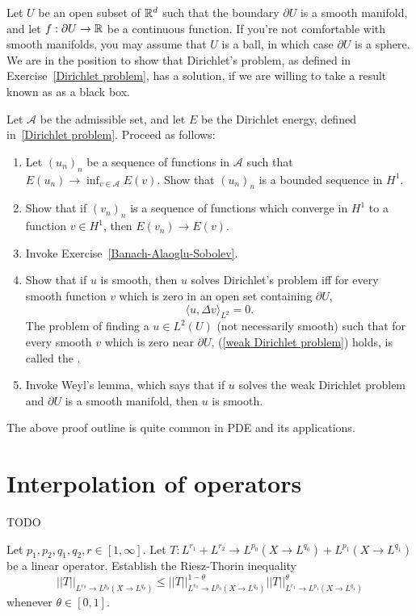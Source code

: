 \begin{exercise}\label{Dirichlet problem 2}
Let $U$ be an open subset of $\mathbb{R}^{d}$ such that the boundary $\partial U$ is a smooth manifold, and let $f: \partial U \to \mathbb{R}$ be a continuous function.
If you're not comfortable with smooth manifolds, you may assume that $U$ is a ball, in which case $\partial U$ is a sphere.
We are in the position to show that Dirichlet's problem, as defined in Exercise~\ref{Dirichlet problem}, has a solution, if we are willing to take a result known as  as a black box.

Let $\mathcal A$ be the admissible set, and let $E$ be the Dirichlet energy, defined in~\ref{Dirichlet problem}.
Proceed as follows:
\begin{enumerate}
\item Let ${(u_{n})}_{n}$ be a sequence of functions in $\mathcal A$ such that $E(u_{n}) \to \inf_{v \in \mathcal A} E(v)$.
Show that ${(u_{n})}_{n}$ is a bounded sequence in $H^{1}$.
\item Show that if ${(v_{n})}_{n}$ is a sequence of functions which converge in $H^{1}$ to a function $v \in H^{1}$, then $E(v_{n}) \to E(v)$.
\item Invoke Exercise~\ref{Banach-Alaoglu-Sobolev}.
\item Show that if $u$ is smooth, then $u$ solves Dirichlet's problem iff for every smooth function $v$ which is zero in an open set containing $\partial U$,
\begin{equation}\label{weak Dirichlet problem}
\langle u, \Delta v\rangle_{L^{2}} = 0.
\end{equation}
The problem of finding a $u \in L^{2}(U)$ (not necessarily smooth) such that for every smooth $v$ which is zero near $\partial U$, (\ref{weak Dirichlet problem}) holds, is called the .
\item Invoke Weyl's lemma, which says that if $u$ solves the weak Dirichlet problem and $\partial U$ is a smooth manifold, then $u$ is smooth.
\end{enumerate}
The above proof outline is quite common in PDE and its applications.
\end{exercise}


\section{Interpolation of operators}
TODO

\begin{exercise}
Let $p_{1},p_{2},q_{1},q_{2},r \in [1, \infty]$. Let $T: L^{r_{1}} + L^{r_{2}} \to L^{p_{0}}(X \to L^{q_{0}}) + L^{p_{1}}(X \to L^{q_{1}})$ be a linear operator.
Establish the Riesz-Thorin inequality
\[||T||_{L^{r_{\theta}} \to L^{p_{\theta}}(X \to L^{q_{\theta}})} \leq ||T||_{L^{r_{0}} \to L^{p_{0}}(X \to L^{q_{0}})}^{1 - \theta} ||T||_{L^{r_{1}} \to L^{p_{1}}(X \to L^{q_{1}})}^{\theta}\]
whenever $\theta \in [0, 1]$.
\end{exercise}

